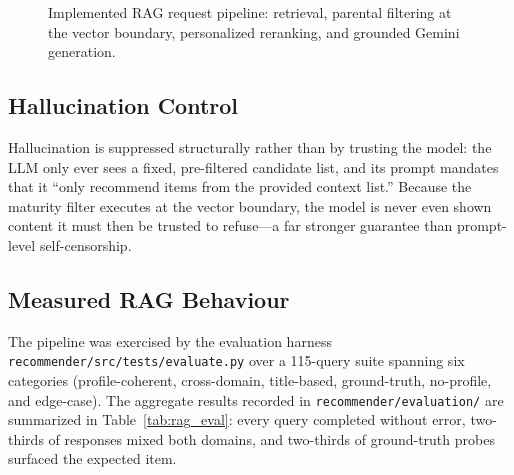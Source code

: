 \begin{figure}[H]
    \centering
    \caption{Implemented RAG request pipeline: retrieval, parental filtering at the vector boundary, personalized reranking, and grounded Gemini generation.}
    \label{fig:rag_pipeline_impl}
\end{figure}

\subsection{Hallucination Control}
Hallucination is suppressed structurally rather than by trusting the model: the LLM only ever sees a fixed, pre-filtered candidate list, and its prompt mandates that it ``only recommend items from the provided context list.'' Because the maturity filter executes at the vector boundary, the model is never even shown content it must then be trusted to refuse---a far stronger guarantee than prompt-level self-censorship.

\subsection{Measured RAG Behaviour}
The pipeline was exercised by the evaluation harness \texttt{recommender/\allowbreak src/\allowbreak tests/\allowbreak evaluate.py} over a 115-query suite spanning six categories (profile-coherent, cross-domain, title-based, ground-truth, no-profile, and edge-case). The aggregate results recorded in \texttt{recommender/evaluation/} are summarized in Table~\ref{tab:rag_eval}: every query completed without error, two-thirds of responses mixed both domains, and two-thirds of ground-truth probes surfaced the expected item.

